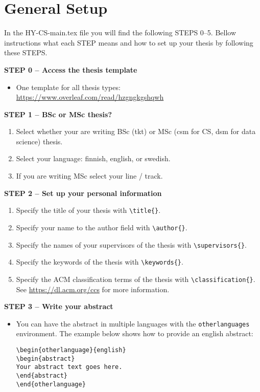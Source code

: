 

\section{General Setup}

In the HY-CS-main.tex file you will find the following STEPS 0--5. Bellow instructions what each STEP means and how to set up your thesis by following these STEPS.
\vspace{0.5cm}

\textbf{STEP 0 -- Access the thesis template}

\begin{itemize}
\item One template for all thesis types: \url{https://www.overleaf.com/read/hzgngkgshqwh}
\end{itemize}


{\textbf{STEP 1 -- BSc or MSc thesis?}}
\begin{enumerate}
\item Select whether your are writing BSc (tkt) or MSc (csm for CS, dsm for data science) thesis.
\item Select your language: finnish, english, or swedish.
\item If you are writing MSc select your line / track.
\end{enumerate}


{\textbf{STEP 2 -- Set up your personal information}}

\begin{enumerate}
\item Specify the title of your thesis with \texttt{\textbackslash title\{\}}.
\item Specify your name to the author field with \texttt{\textbackslash author\{\}}.
\item Specify the names of your supervisors of the thesis with \texttt{\textbackslash supervisors\{\}}.
\item Specify the keywords of the thesis with \texttt{\textbackslash keywords\{\}}.
\item Specify the ACM classification terms of the thesis with \texttt{\textbackslash classification\{\}}. See \url{https://dl.acm.org/ccs} for more information.
\end{enumerate}

{\textbf{STEP 3 -- Write your abstract}}

\begin{itemize}
\item You can have the abstract in multiple languages with the \texttt{otherlanguages} environment. The example below shows how to provide an english abstract: 

\begin{verbatim}
\begin{otherlanguage}{english} 
\begin{abstract}
Your abstract text goes here. 
\end{abstract} 
\end{otherlanguage}
\end{verbatim}

\end{itemize}

